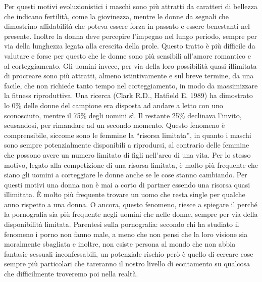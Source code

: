 \documentclass[12pt]{book} %
\begin{document}
Per questi motivi evoluzionistici i maschi sono più attratti da caratteri di bellezza che indicano fertilità, come la giovinezza, mentre le
donne da segnali che dimostrino affidabilità che poteva essere forza in passato e essere benestanti nel presente.
Inoltre la donna deve percepire l'impegno nel lungo periodo, sempre per via della lunghezza legata
alla crescita della prole. Questo tratto è più difficile da valutare e forse per questo che le donne sono più sensibili
all'amore romantico e al corteggiamento. Gli uomini invece, per via della loro possibilità quasi
illimitata di procreare sono più attratti, almeno istintivamente e sul breve termine, da una facile, che non richiede
tanto tempo nel corteggiamento, in modo da massimizzare la fitness riproduttiva. Una ricerca (Clark R.D., Hatfield E.
1989) ha dimostrato lo 0\% delle donne del campione era disposta ad andare a letto con uno sconosciuto, mentre il 75\%
degli uomini sì. Il restante 25\% declinava l'invito, scusandosi, per rimandare ad un secondo
momento. Questo fenomeno è comprensibile, siccome sono le femmine la “risorsa limitata”, in quanto i maschi sono sempre
potenzialmente disponibili a riprodursi, al contrario delle femmine che possono avere un numero limitato di figli
nell'arco di una vita. Per lo stesso motivo, legato alla competizione di una risorsa limitata, è
molto più frequente che siano gli uomini a corteggiare le donne anche se le cose stanno cambiando. Per questi motivi
una donna non è mai a corto di partner essendo una risorsa quasi illimitata. È molto più frequente trovare un uomo
che resta single per qualche anno rispetto a una donna. O ancora, questo fenomeno, riesce a spiegare il perché la
pornografia sia più frequente negli uomini che nelle donne, sempre per via della disponibilità limitata. Parentesi
sulla pornografia: secondo chi ha studiato il fenomeno i porno non fanno male, a meno che non pensi che la loro visione
sia moralmente sbagliata e inoltre, non esiste
persona al mondo che non abbia fantasie sessuali inconfessabili, un potenziale rischio però è quello di cercare cose sempre più particolari che tareranno il nostro livello di eccitamento su qualcosa che difficilmente troveremo poi nella realtà. 
\end{document}

